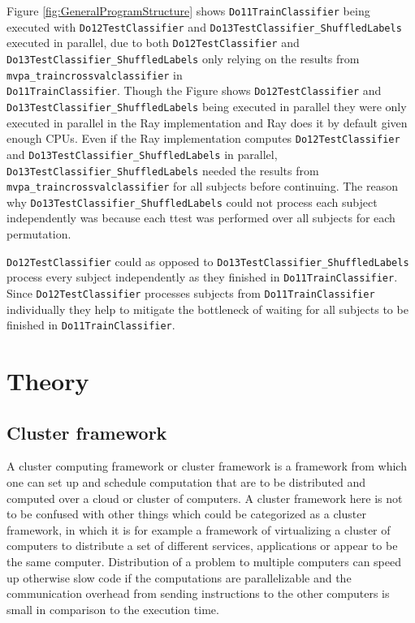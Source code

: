 \documentclass[12pt, a4paper]{article}
\begin{document}
Figure \ref{fig:GeneralProgramStructure} shows \texttt{Do11TrainClassifier} being executed with \texttt{Do12TestClassifier} and \texttt{Do13TestClassifier\_ShuffledLabels} executed in parallel, due to both \texttt{Do12TestClassifier} and \texttt{Do13TestClassifier\_ShuffledLabels} only relying on the results from \texttt{mvpa\_traincrossvalclassifier} in\\
\texttt{Do11TrainClassifier}.
Though the Figure shows \texttt{Do12TestClassifier} and \texttt{Do13TestClassifier\_ShuffledLabels} being executed in parallel they were only executed in parallel in the Ray implementation and Ray does it by default given enough CPUs.
Even if the Ray implementation computes \texttt{Do12TestClassifier} and \texttt{Do13TestClassifier\_ShuffledLabels} in parallel, \texttt{Do13TestClassifier\_ShuffledLabels} needed the results from \texttt{mvpa\_traincrossvalclassifier} for all subjects before continuing.
The reason why \texttt{Do13TestClassifier\_ShuffledLabels} could not process each subject independently was because each ttest was performed over all subjects for each permutation.

\texttt{Do12TestClassifier} could as opposed to \texttt{Do13TestClassifier\_ShuffledLabels} process every subject independently as they finished in \texttt{Do11TrainClassifier}.
Since \texttt{Do12TestClassifier} processes subjects from \texttt{Do11TrainClassifier} individually they help to mitigate the bottleneck of waiting for all subjects to be finished in \texttt{Do11TrainClassifier}.
 

\section{Theory}

\subsection{Cluster framework}

A cluster computing framework or cluster framework is a framework from which one can set up and schedule computation that are to be distributed and computed over a cloud or cluster of computers.
A cluster framework here is not to be confused with other things which could be categorized as a cluster framework, in which it is for example a framework of virtualizing a cluster of computers to distribute a set of different services, applications or appear to be the same computer.
Distribution of a problem to multiple computers can speed up otherwise slow code if the computations are parallelizable and the communication overhead from sending instructions to the other computers is small in comparison to the execution time.
\end{document}
